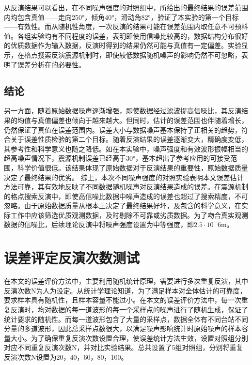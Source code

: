 从反演结果可以看出，在不同噪声强度的对照组中，所给出的最终结果的误差范围内均包含真值——走向250°，倾角40°，滑动角82°，验证了本实验的第一个目标——有效性。而从随机性角度，一次反演的结果可能在误差范围内取任意不可预料值。各组实验均有不同程度的误差，表明即使用信噪比较高的，数据结构分布很好的优质数据作为输入数据，反演时得到的结果仍然可能与真值有一定偏差。实验显示，在格点搜索反演震源机制时，即使较低数据随机噪声的影响仍然不可忽略，表明了误差分析在的必要性。

\subsection{结论}
另一方面，随着原始数据噪声逐渐增强，即使数据经过滤波提高信噪比，其反演结果的均值与真值偏差也倾向于越来越大。但同时，估计的误差范围也伴随着增长，仍然保证了真值在误差范围内。误差大小与数据噪声基本保持了正相关的趋势，符合关于误差性质检验的第二个目标。随着反演结果的误差逐渐变大，精确度变低，其参考性和科学意义也随之降低。如在本实验中，噪声强度和有效波形振幅相当的超高噪声情况下，震源机制误差已经高于30°，基本超出了参考应用的可接受范围，科学价值很低。该结果体现了原始数据对于反演结果的重要性，原始数据质量决定了最终结果的优劣。 综上，本次不同噪声强度的对照实验表明本文误差估计方法可靠，其有效地反映了不同数据随机噪声对反演结果造成的误差。在震源机制的格点搜索反演中，即使高信噪比数据中噪声造成的误差也超过了搜索精度，不可忽略。由于原始数据质量从根本上决定了最终结果好坏，及包含的科学意义，在实际工作中应该筛选优质观测数据，及时剔除不可靠或劣质数据。为了吻合真实观测数据的信噪比，后续理论反演中将噪声强度设置为中等强度，即$2.5\cdot10^-{6}$m。

\section{误差评定反演次数测试}
在本文的误差评价方法中，主要利用随机统计原理，需要进行多次重复反演，其中反演次数N为人为设定。从统计学理论知道，为了满足样本对全体估计的可靠度，要求样本具有随机性，且样本容量不能过小。在本文的误差评价方法中，每一次重复反演时，均对数据的每一道波形的每一个采样点的噪声进行了随机生成，保证了统计要求的随机性。而每一道波形包含了大量的采样点，数据全体有不同台站不同分量的多道波形，因此总采样点数很大，以满足噪声影响统计时原始噪声的样本容量大小。为了确保重复反演次数设置合理，使误差统计方法生效，设置对照组分别对应不同重复反演次数N，并对比实验结果。总共设置了5组对照组，分别将重复反演次数N设置为20，40，60，80，100。

